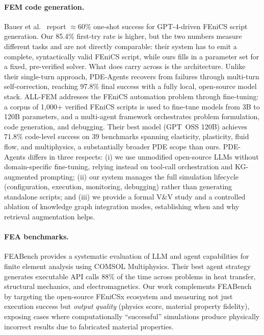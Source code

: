 \documentclass[preprint,review,12pt]{elsarticle}
\newif\ifrevisionsvisible
\newcommand{\revised}[1]{%
  \ifrevisionsvisible\textcolor{revisionred}{#1}\else#1\fi}
\begin{document}
\paragraph{FEM code generation.}
Bauer et al.~\cite{bauer2023llm} report $\approx 60\%$ one-shot success for
GPT-4-driven FEniCS script generation.  \revised{Our 85.4\% first-try rate is
higher, but the two numbers measure different tasks and are not directly
comparable: their system has to emit a complete, syntactically valid
FEniCS script, while ours fills in a parameter set for a fixed,
pre-verified solver.  What does carry across is the architecture.  Unlike}
their single-turn approach, PDE-Agents recovers from failures through
multi-turn self-correction, reaching 97.8\% final success with a fully
local, open-source model stack.
ALL-FEM \citep{deotale2026allfem} addresses the FEniCS automation problem
through fine-tuning: a corpus of 1{,}000+ verified FEniCS scripts is
used to fine-tune models from 3B to 120B parameters, and a multi-agent
framework orchestrates problem formulation, code generation, and
debugging.  Their best model (GPT~OSS 120B) achieves 71.8\% code-level
success on 39 benchmarks spanning elasticity, plasticity, fluid flow,
and multiphysics, a substantially broader PDE scope than ours.
PDE-Agents differs in three respects: (i) we use unmodified
open-source LLMs without domain-specific fine-tuning, relying instead
on tool-call orchestration and KG-augmented prompting;
(ii) our system manages the full simulation lifecycle (configuration,
execution, monitoring, debugging) rather than generating standalone
scripts; and (iii) we provide a formal V\&V study and a controlled
ablation of knowledge graph integration modes, establishing when and
why retrieval augmentation helps.

\paragraph{FEA benchmarks.}
FEABench \citep{mudur2025feabench} provides a systematic evaluation of
LLM and agent capabilities for finite element analysis using COMSOL
Multiphysics.  Their best agent strategy generates executable API calls
88\% of the time across problems in heat transfer, structural mechanics,
and electromagnetics.  Our work complements FEABench by targeting the
open-source FEniCSx ecosystem and measuring not just execution success
but \emph{output quality} (physics score, material property fidelity),
exposing cases where computationally ``successful'' simulations produce
physically incorrect results due to fabricated material properties.
\end{document}
